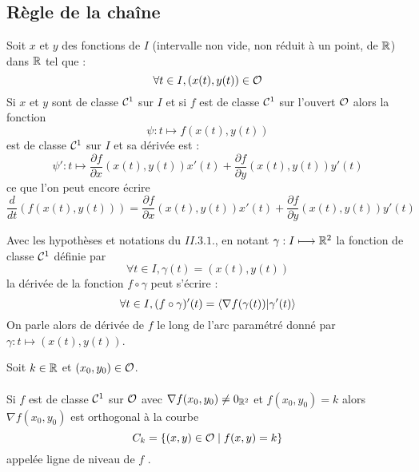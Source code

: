 \subsection{Règle de la chaîne}
\begin{theo}
    Soit \(x\) et \(y\) des fonctions de \(I\) (intervalle non vide, non réduit à un point, de \(\R\)) dans \(\R\) tel que :
    \[\forall t \in I, (x(t), y(t)) \in \cal{O}\]
    Si \(x\) et \(y\) sont de classe \(\cal{C}^{1}\) sur \(I\) et si \(f\) est de classe \(\cal{C}^{1}\) sur l’ouvert \(\cal{O}\) alors la fonction 
        \[\psi : t \mapsto f (x(t), y(t))\]
    est de classe \(\cal{C}^{1}\) sur \(I\) et sa dérivée est :
    \[\psi' : t \mapsto \frac{\partial f}{\partial x} (x(t), y(t)) x'(t) + \frac{\partial f}{\partial y} (x(t), y(t)) y'(t)\]
    ce que l’on peut encore écrire
    \[\frac{d}{dt} (f (x(t), y(t))) = \frac{\partial f}{\partial x} (x(t), y(t)) x'(t) + \frac{\partial f}{\partial y} (x(t), y(t)) y'(t)\]
\end{theo}
\begin{defprop}
    Avec les hypothèses et notations du \(II. 3. 1.\), en notant \(\gamma : I \mapsto \R^2\) la fonction de classe \(\cal{C}^{1}\) définie par 
    \[\forall t \in I, \gamma(t) = (x(t), y(t))\]
    la dérivée de la fonction \(f \circ \gamma\) peut s’écrire :
    \[\forall t \in I, (f \circ \gamma)' (t) = \scal{ \nabla f (\gamma(t))}{ \gamma'(t) }\]
    On parle alors de dérivée de \(f\) le long de l’arc paramétré donné par \(\gamma : t \mapsto (x(t), y(t))\).
\end{defprop}
\begin{defprop}
    Soit \(k \in \R\) et \((x_0, y_0) \in \cal{O}\).\\~\\
    Si \(f\) est de classe \(\cal{C}^{1}\) sur \(\cal{O}\) avec \(\nabla f (x_0, y_0)\neq 0_{\R^2}\) et \(f (x_0, y_0) = k\) alors \(\nabla f (x_0, y_0)\) est orthogonal à la courbe
    \[C_k = \accol{(x, y) \in \cal{O} \tq f (x, y) = k}\]
    appelée ligne de niveau de \(f\) .
\end{defprop}
